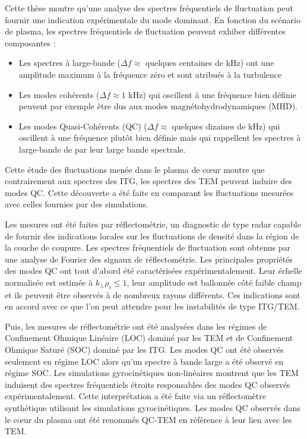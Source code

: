 Cette thèse montre qu’une analyse des spectres fréquentiels de fluctuation peut fournir une indication expérimentale du mode dominant. En fonction du scénario de plasma, les spectres fréquentiels de fluctuation peuvent exhiber différentes composantes :
\begin{itemize}
	\item Les spectres à large-bande ($\Delta f\approx$ quelques centaines de kHz) ont une amplitude maximum à la fréquence zéro et sont atribués à la turbulence
	\item Les modes cohérents ($\Delta f\approx1$ kHz) qui oscillent à une fréquence bien définie peuvent par exemple être dus aux modes magnétohydrodynamiques (MHD).
	\item Les modes Quasi-Cohérents (QC) ($\Delta f\approx$ quelques dizaines de kHz) qui oscillent à une fréquence plutôt bien définie mais qui rappellent les spectres à large-bande de par leur large bande spectrale.
\end{itemize}
Cette étude des fluctuations menée dans le plasma de cœur montre que contrairement aux spectres des ITG, les spectres des TEM peuvent induire des modes QC. Cette découverte a été faite en comparant les fluctuations mesurées avec celles fournies par des simulations.

Les mesures ont été faites par réflectométrie, un diagnostic de type radar capable de fournir des indications locales sur les fluctuations de densité dans la région de la couche de coupure. Les spectres fréquentiels de fluctuation sont obtenus par une analyse de Fourier des signaux de réflectométrie. Les principales propriétés des modes QC ont tout d’abord été caractérisées expérimentalement. Leur échelle normalisée est estimée à $k_{\perp}\rho_i \leq 1$, leur amplitude est ballonnée côté faible champ et ils peuvent être observés à de nombreux rayons différents. Ces indications sont en accord avec ce que l’on peut attendre pour les instabilités de type ITG/TEM.

Puis, les mesures de réflectométrie ont été analysées dans les régimes de Confinement Ohmique Linéaire (LOC) dominé par les TEM et de Confinement Ohmique Saturé (SOC) dominé par les ITG. Les modes QC ont été observés seulement en régime LOC alors qu'un spectre à bande large a été observé en régime SOC. Les simulations gyrocinétiques non-linéaires montrent que les TEM induisent des spectres fréquentiels étroits responsables des modes QC observés expérimentalement. Cette interprétation a été faite via un réflectomètre synthétique utilisant les simulations gyrocinétiques. Les modes QC observés dans le cœur du plasma ont été renommés QC-TEM en référence à leur lien avec les TEM.

